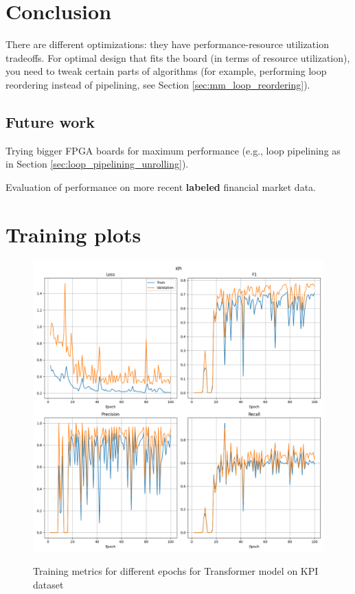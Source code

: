 \documentclass[a4paper, twoside]{report}
\theoremstyle{definition}
\numberwithin{equation}{section}
\begin{document}
\newpage
\chapter*{Conclusion}

There are different optimizations: they have performance-resource utilization tradeoffs.
For optimal design that fits the board (in terms of resource utilization),
you need to tweak certain parts of algorithms (for example, performing loop
reordering instead of pipelining, see Section \ref{sec:mm_loop_reordering}).

\section{Future work}
Trying bigger FPGA boards for maximum performance (e.g., loop pipelining as in Section \ref{sec:loop_pipelining_unrolling}).

Evaluation of performance on more recent \textbf{labeled} financial market data.


\newpage
\appendix
\chapter{Training plots} \label{app:training_plots}

\begin{figure}[h!]
    \centering
    \caption{Training metrics for different epochs for Transformer model on KPI dataset}
    \includegraphics[width=\textwidth]{plots/Transformer_KPI.png}
    \label{fig:Transformer_KPI_training}
\end{figure}
\end{document}
